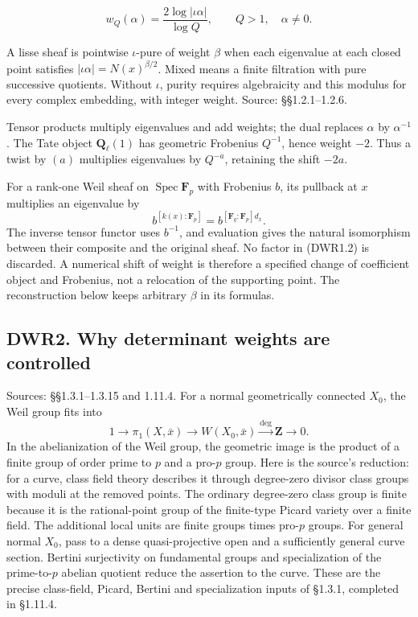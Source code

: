 \[
w_Q(\alpha)=\frac{2\log|\iota\alpha|}{\log Q},\qquad Q>1,\quad\alpha\ne0.
\tag{DWR1.1}
\]

A lisse sheaf is pointwise \(\iota\)-pure of weight \(\beta\) when each
eigenvalue at each closed point satisfies
\(|\iota\alpha|=N(x)^{\beta/2}\). Mixed means a finite filtration with
pure successive quotients. Without \(\iota\), purity requires
algebraicity and this modulus for every complex embedding, with integer
weight. Source: §§1.2.1--1.2.6.

Tensor products multiply eigenvalues and add weights; the dual replaces
\(\alpha\) by \(\alpha^{-1}\). The Tate object \(\mathbf Q_\ell(1)\) has
geometric Frobenius \(Q^{-1}\), hence weight \(-2\). Thus a twist by
\((a)\) multiplies eigenvalues by \(Q^{-a}\), retaining the shift
\(-2a\).

For a rank-one Weil sheaf on \(\operatorname{Spec}\mathbf F_p\) with
Frobenius \(b\), its pullback at \(x\) multiplies an eigenvalue by \[
b^{[k(x):\mathbf F_p]}=b^{[\mathbf F_q:\mathbf F_p]d_x}.
\tag{DWR1.2}
\] The inverse tensor functor uses \(b^{-1}\), and evaluation gives the
natural isomorphism between their composite and the original sheaf. No
factor in (DWR1.2) is discarded. A numerical shift of weight is
therefore a specified change of coefficient object and Frobenius, not a
relocation of the supporting point. The reconstruction below keeps
arbitrary \(\beta\) in its formulas.

\subsection{DWR2. Why determinant weights are
controlled}\label{dwr2.-why-determinant-weights-are-controlled}

Sources: §§1.3.1--1.3.15 and 1.11.4. For a normal geometrically
connected \(X_0\), the Weil group fits into \[
1\longrightarrow\pi_1(X,\bar x)\longrightarrow W(X_0,\bar x)
\xrightarrow{\deg}\mathbf Z\longrightarrow0.
\tag{DWR2.1}
\] In the abelianization of the Weil group, the geometric image is the
product of a finite group of order prime to \(p\) and a pro-\(p\) group.
Here is the source's reduction: for a curve, class field theory
describes it through degree-zero divisor class groups with moduli at the
removed points. The ordinary degree-zero class group is finite because
it is the rational-point group of the finite-type Picard variety over a
finite field. The additional local units are finite groups times
pro-\(p\) groups. For general normal \(X_0\), pass to a dense
quasi-projective open and a sufficiently general curve section. Bertini
surjectivity on fundamental groups and specialization of the
prime-to-\(p\) abelian quotient reduce the assertion to the curve. These
are the precise class-field, Picard, Bertini and specialization inputs
of §1.3.1, completed in §1.11.4.

